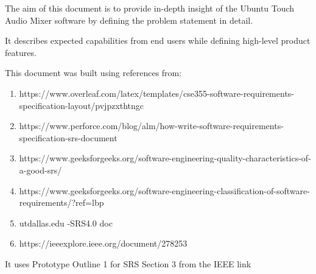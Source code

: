 
\label{ch:intro}
The aim of this document is to provide in-depth insight of the Ubuntu Touch Audio Mixer software by defining the problem statement in detail. 

It describes expected capabilities from end users while defining high-level product features.


This document was built using references from:


\begin{enumerate}
\item https://www.overleaf.com/latex/templates/cse355-software-requirements-specification-layout/pvjpzxthtngc
\item https://www.perforce.com/blog/alm/how-write-software-requirements-specification-srs-document
\item https://www.geeksforgeeks.org/software-engineering-quality-characteristics-of-a-good-srs/
\item https://www.geeksforgeeks.org/software-engineering-classification-of-software-requirements/?ref=lbp
\item utdallas.edu -SRS4.0 doc
\item https://ieeexplore.ieee.org/document/278253
\end{enumerate}


It uses Prototype Outline 1 for SRS Section 3 from the IEEE link
